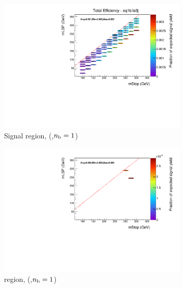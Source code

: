 \begin{figure}[p]
\begin{subfigure}[b]{0.47\textwidth}
    \includegraphics[width=\textwidth]{Figs/sms/t2cc/v37/effs/T2cc_had_eff_maps_eq1b_le3j_SITV.pdf}
    \caption{Signal region, (\njlow,$n_{\text{b}}=1$)}
    \label{fig:t2cc_sig_eff_le3j_1b}
  \end{subfigure}
  \begin{subfigure}[b]{0.47\textwidth}
    \includegraphics[width=\textwidth]{Figs/sms/t2cc/v37/effs/T2cc_muon_eff_maps_eq1b_le3j_SITV.pdf}
    \caption{\mj region, (\njlow,$n_{\text{b}}=1$)}
    \label{fig:t2cc_mu_eff_le3j_1b}
  \end{subfigure} \\
  \begin{subfigure}[b]{0.47\textwidth}

\end{subfigure}
\end{figure}

